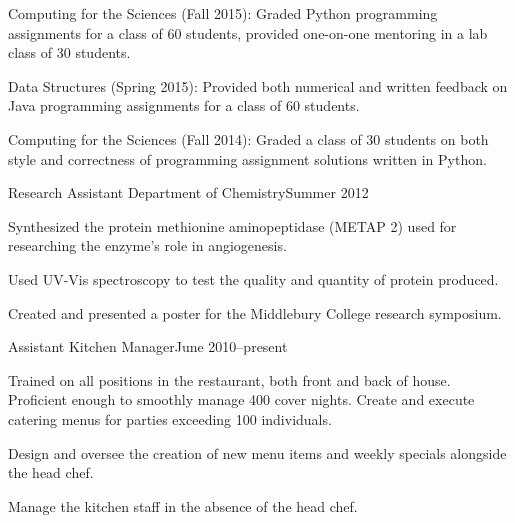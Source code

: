 \documentclass[10pt]{resume}
\begin{document}
{
    \item Computing for the Sciences (Fall 2015): Graded Python
    programming assignments for a class of 60 students, provided one-on-one
    mentoring in a lab class of 30 students.

    \item Data Structures (Spring 2015): Provided both numerical and
    written feedback on Java programming assignments for a class of 60
    students.

    \item Computing for the Sciences (Fall 2014): Graded a class of 30
    students on both style and correctness of programming assignment solutions
    written in Python. 
}

\expblock
{Research Assistant \textnormal{Department of Chemistry}}{Summer 2012}
{
    \item Synthesized the protein methionine aminopeptidase (METAP 2) used for
    researching the enzyme's role in angiogenesis.

    \item Used UV-Vis spectroscopy to test the quality and quantity of protein
    produced. 

    \item Created and presented a poster for the Middlebury College research
    symposium. 
}

\expblock
{Assistant Kitchen Manager}{June 2010--present}
{
    \item Trained on all positions in the restaurant, both front and back of
    house. Proficient enough to smoothly manage 400 cover nights. Create
    and execute catering menus for parties exceeding 100 individuals.

    \item Design and oversee the creation of new menu items and weekly
    specials alongside the head chef.

    \item Manage the kitchen staff in the absence of the head chef.
}
\end{document}

